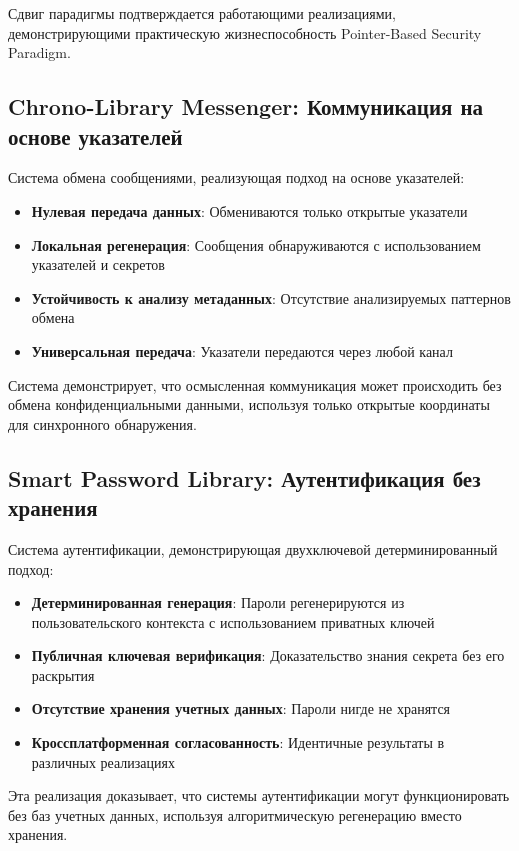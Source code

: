 \documentclass[11pt,a4paper]{article}
\begin{document}
Сдвиг парадигмы подтверждается работающими реализациями, демонстрирующими практическую жизнеспособность Pointer-Based Security Paradigm.

\subsection{Chrono-Library Messenger: Коммуникация на основе указателей}

Система обмена сообщениями, реализующая подход на основе указателей:

\begin{itemize}
    \item \textbf{Нулевая передача данных}: Обмениваются только открытые указатели
    \item \textbf{Локальная регенерация}: Сообщения обнаруживаются с использованием указателей и секретов
    \item \textbf{Устойчивость к анализу метаданных}: Отсутствие анализируемых паттернов обмена
    \item \textbf{Универсальная передача}: Указатели передаются через любой канал
\end{itemize}

Система демонстрирует, что осмысленная коммуникация может происходить без обмена конфиденциальными данными, используя только открытые координаты для синхронного обнаружения.

\subsection{Smart Password Library: Аутентификация без хранения}

Система аутентификации, демонстрирующая двухключевой детерминированный подход:

\begin{itemize}
    \item \textbf{Детерминированная генерация}: Пароли регенерируются из пользовательского контекста с использованием приватных ключей
    \item \textbf{Публичная ключевая верификация}: Доказательство знания секрета без его раскрытия
    \item \textbf{Отсутствие хранения учетных данных}: Пароли нигде не хранятся
    \item \textbf{Кроссплатформенная согласованность}: Идентичные результаты в различных реализациях
\end{itemize}

Эта реализация доказывает, что системы аутентификации могут функционировать без баз учетных данных, используя алгоритмическую регенерацию вместо хранения.
\end{document}
